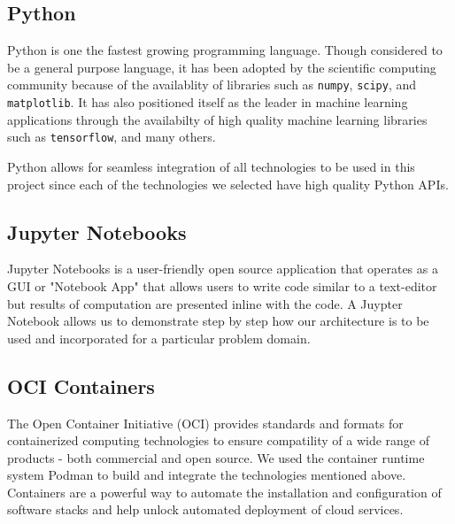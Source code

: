 \documentclass[conference,twoside]{IEEEtran}
\newcommand{\code}[1]{\texttt{#1}}
\begin{document}
\subsection{Python}
Python is one the fastest growing programming language\cite{python}. Though considered to be a general purpose language, it has been adopted by the scientific computing community because of the availablity of libraries such as \code{numpy}, \code{scipy}, and \code{matplotlib}. It has also positioned itself as the leader in machine learning applications through the availabilty of high quality machine learning libraries such as \code{tensorflow}, and many others.

Python allows for seamless integration of all technologies to be used in this project since each of the technologies we selected have high quality Python APIs.

\subsection{Jupyter Notebooks}
Jupyter Notebooks is a user-friendly open source application that operates as a GUI or "Notebook App" that allows users to write code similar to a text-editor but results of computation are presented inline with the code\cite{jupyter}. A Juypter Notebook allows us to demonstrate step by step how our architecture is to be used and incorporated for a particular problem domain.


\subsection{OCI Containers}
The Open Container Initiative (OCI) provides standards and formats for containerized computing technologies to ensure compatility of a wide range of products - both commercial and open source\cite{OCI}. We used the container runtime system Podman\cite{rhelpodman} to build and integrate the technologies mentioned above. Containers are a powerful way to automate the installation and configuration of software stacks and help unlock automated deployment of cloud services\cite{gartnercontainer}.
\end{document}
